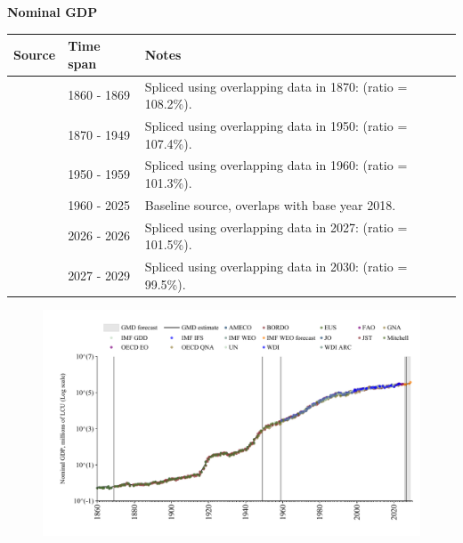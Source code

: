 \documentclass[12pt,a4paper,landscape]{article}
\begin{document}
\begin{adjustbox}{max totalsize={\paperwidth}{\paperheight},center}
\begin{minipage}[t][\textheight][t]{\textwidth}
\vspace*{0.5cm}
{}
\begin{center}
{\Large\bfseries Nominal GDP}
\end{center}
\vspace{0.5cm}
\begin{table}[H]
\centering
\small
\begin{tabular}{|l|l|l|}
\hline
\textbf{Source} & \textbf{Time span} & \textbf{Notes} \\
\hline
\rowcolor{white}\cite{Mitchell}& 1860 - 1869 &Spliced using overlapping data in 1870: (ratio = 108.2\%). \\
\rowcolor{lightgray}\cite{JST}& 1870 - 1949 &Spliced using overlapping data in 1950: (ratio = 107.4\%). \\
\rowcolor{white}\cite{IMF_GDD}& 1950 - 1959 &Spliced using overlapping data in 1960: (ratio = 101.3\%). \\
\rowcolor{lightgray}\cite{OECD_EO}& 1960 - 2025 &Baseline source, overlaps with base year 2018. \\
\rowcolor{white}\cite{AMECO}& 2026 - 2026 &Spliced using overlapping data in 2027: (ratio = 101.5\%). \\
\rowcolor{lightgray}\cite{IMF_WEO_forecast}& 2027 - 2029 &Spliced using overlapping data in 2030: (ratio = 99.5\%). \\
\hline
\end{tabular}
\end{table}
\begin{figure}[H]
\centering
\includegraphics[width=\textwidth,height=0.6\textheight,keepaspectratio]{graphs/FIN_nGDP.pdf}
\end{figure}
\end{minipage}
\end{adjustbox}
\end{document}
